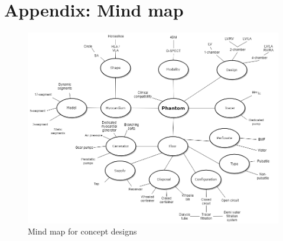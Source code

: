 
\chapter{Appendix: Mind map }
\label{app:mind_map}

\begin{figure} [H]
\includegraphics[width=\textwidth,height=\textheight,keepaspectratio]{./images/concept_diagram.png}
\caption{Mind map for concept designs}
\label{fig:mind_map}
\end{figure}

